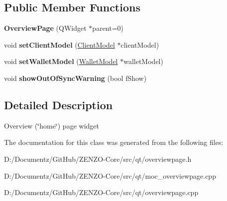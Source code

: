 \subsection*{Public Member Functions}
\begin{DoxyCompactItemize}
\item 
\mbox{\label{class_overview_page_a18c1a29cab6b745b25e701b20f234932}} 
{\bfseries Overview\+Page} (Q\+Widget $\ast$parent=0)
\item 
\mbox{\label{class_overview_page_a5d2610ab2b9c58e3b5f67c05f984e097}} 
void {\bfseries set\+Client\+Model} (\mbox{\hyperlink{class_client_model}{Client\+Model}} $\ast$client\+Model)
\item 
\mbox{\label{class_overview_page_a2ed52a3a87e9c74fee38fa873c9bc71f}} 
void {\bfseries set\+Wallet\+Model} (\mbox{\hyperlink{class_wallet_model}{Wallet\+Model}} $\ast$wallet\+Model)
\item 
\mbox{\label{class_overview_page_ac96ea713a074e706b4b6eadaadeca9d1}} 
void {\bfseries show\+Out\+Of\+Sync\+Warning} (bool f\+Show)
\end{DoxyCompactItemize}


\subsection{Detailed Description}
Overview (\char`\"{}home\char`\"{}) page widget 

The documentation for this class was generated from the following files\+:\begin{DoxyCompactItemize}
\item 
D\+:/\+Documentz/\+Git\+Hub/\+Z\+E\+N\+Z\+O-\/\+Core/src/qt/overviewpage.\+h\item 
D\+:/\+Documentz/\+Git\+Hub/\+Z\+E\+N\+Z\+O-\/\+Core/src/qt/moc\+\_\+overviewpage.\+cpp\item 
D\+:/\+Documentz/\+Git\+Hub/\+Z\+E\+N\+Z\+O-\/\+Core/src/qt/overviewpage.\+cpp\end{DoxyCompactItemize}
